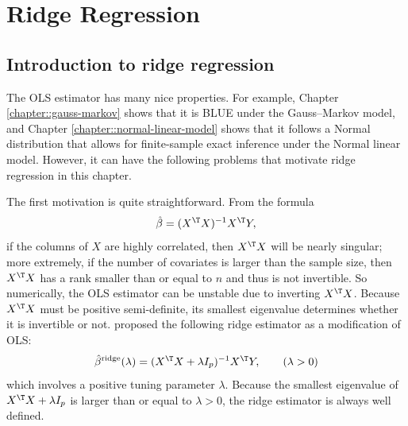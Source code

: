  
\chapter{Ridge Regression}
 

\section{Introduction to ridge regression}

The OLS estimator has many nice properties. For example, Chapter \ref{chapter::gauss-markov} shows that it is BLUE
under the Gauss--Markov model, and Chapter \ref{chapter::normal-linear-model} shows that it follows a Normal distribution that allows for finite-sample exact inference under the Normal linear model. However, it can have the following problems that motivate ridge regression in this chapter. 

The first motivation is quite straightforward. 
From the formula
\[
\hat{\beta}=(X^{\T}X)^{-1}X^{\T}Y,
\]
if the columns of $X$ are highly correlated, then $X^{\T}X$ will
be nearly singular; more extremely, if the number of covariates is larger than the sample size, then $X^{\T}X$ has a rank smaller than
or equal to $n$ and thus is not invertible. So numerically, the OLS
estimator can be unstable due to inverting $X^{\T}X$. Because $X^{\T}X$
must be positive semi-definite, its smallest eigenvalue determines
whether it is invertible or not. \citet{hoerl1970ridge} proposed
the following ridge estimator as a modification of OLS:
\begin{equation}
\hat{\beta}^{\text{ridge}}(\lambda)=(X^{\T}X+\lambda I_{p})^{-1}X^{\T}Y, \qquad(\lambda>0)
\label{eq::ridge-hoerl1970form}
\end{equation}
which involves a positive tuning parameter $\lambda$. 
Because the smallest eigenvalue of $X^{\T}X+\lambda I_{p}$ is larger
than or equal to $\lambda>0$, the ridge estimator is always well
defined. 


